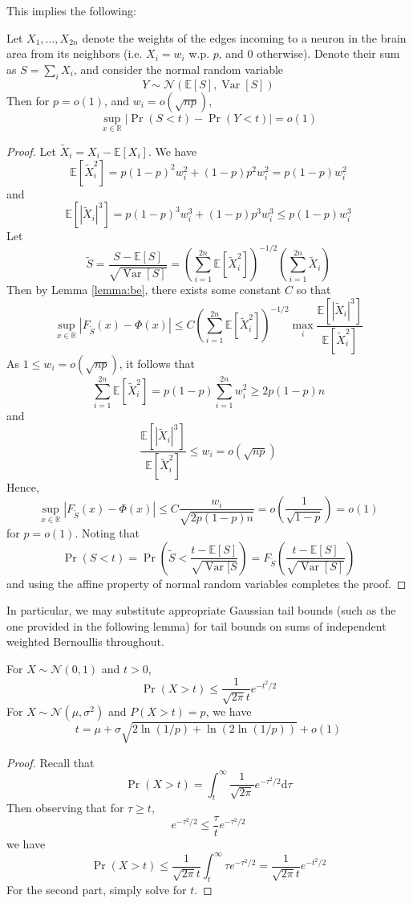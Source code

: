 \documentclass[final,12pt]{colt2022} %
\newcommand{\R}{\mathbb{R}}
\newcommand{\E}{\mathbb{E}}
\DeclareMathOperator{\var}{Var}
\begin{document}
\noindent This implies the following:

\begin{lemma} \label{lemma:normalapprox}
Let $X_1, \ldots, X_{2n}$ denote the weights of the edges incoming to a neuron in the brain area from its neighbors (i.e. $X_i = w_i$ w.p. $p$, and $0$ otherwise). Denote their sum as $S = \sum_i X_i$, and consider the normal random variable
\[Y \sim \mathcal N(\E[S], \var[S])\]
Then for $p = o(1)$, and $w_i = o(\sqrt{np})$,
\[\sup_{x \in \R} |\Pr(S < t) - \Pr(Y < t)| = o(1)  \]
\end{lemma}

\begin{proof}
Let $\tilde X_i = X_i - \E[X_i]$. We have
\[\E[\tilde X_i^2] = p(1-p)^2w_i^2 + (1-p)p^2w_i^2 = p(1-p)w_i^2\]
and
\[\E[|\tilde X_i|^3] = p(1-p)^3w_i^3 + (1-p)p^3w_i^3 \le p(1-p)w_i^3\]
Let 
\[\tilde S = \frac{S - \E[S]}{\sqrt{\var[S]}} = \left(\sum_{i=1}^{2n} \E[\tilde X_i^2]\right)^{-1/2} \left(\sum_{i=1}^{2n} \tilde X_i \right)\]
Then by Lemma \ref{lemma:be}, there exists some constant $C$ so that
\[\sup_{x \in \R} |F_{\tilde S}(x) - \Phi(x)| \le C \left(\sum_{i=1}^{2n} \E[\tilde X_i^2]\right)^{-1/2} \max_i \frac{\E[|\tilde X_i|^3]}{\E[\tilde X_i^2]}\]
As $1 \le w_i =o(\sqrt{np})$, it follows that
\[\sum_{i=1}^{2n} \E[\tilde X_i^2] = p(1-p) \sum_{i=1}^{2n} w_i^2 \ge 2p(1-p) n\]
and
\[\frac{\E[|\tilde X_i|^3]}{\E[\tilde X_i^2]} \le w_i = o(\sqrt{np})\]
Hence, 
\[\sup_{x \in \R} |F_{\tilde S}(x) - \Phi(x)| \le C \frac{w_i}{\sqrt{2p(1-p)n}} = o\left(\frac{1}{\sqrt{1-p}}\right) = o(1)\]
for $p = o(1)$. Noting that 
\[\Pr(S < t) = \Pr\left(\tilde S < \frac{t - \E[S]}{\sqrt{\var[S}}\right) = F_{\tilde S}\left(\frac{t - \E[S]}{\sqrt{\var[S]}}\right)\]
and using the affine property of normal random variables completes the proof.
\end{proof}

\noindent In particular, we may substitute appropriate Gaussian tail bounds (such as the one provided in the following lemma) for tail bounds on sums of independent weighted Bernoullis throughout.

\begin{lemma}\label{lemma:tail}
For $X \sim \mathcal N(0, 1)$ and $t > 0$, \[\Pr (X > t) \leq \frac{1}{\sqrt{2\pi}t} e^{-t^2/2}\]
For $X \sim \mathcal N(\mu, \sigma^2)$ and $P(X > t) = p$, we have \[t = \mu + \sigma \sqrt{2\ln(1/p) + \ln(2\ln(1/p))} + o(1)\]
\end{lemma}
\begin{proof}
Recall that \[\Pr(X > t) = \int_t^\infty \frac{1}{\sqrt{2\pi}} e^{-\tau^2 / 2} \text{d}\tau\] Then observing that for $\tau \ge t$, \[ e^{-\tau^2 / 2} \le \frac{\tau}{t} e^{-\tau^2 / 2}\] we have \[\Pr(X > t) \le \frac{1}{\sqrt{2\pi}t}\int_t^\infty \tau e^{-\tau^2 / 2} = \frac{1}{\sqrt{2\pi}t}e^{-t^2/2} \] For the second part, simply solve for $t$.
\end{proof}
\end{document}
